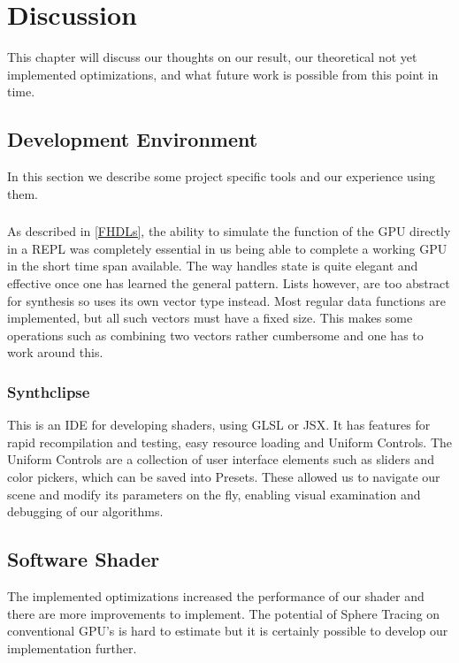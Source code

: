 \chapter{Discussion} 

	This chapter will discuss our thoughts on our result, our theoretical not
	yet	implemented optimizations, and what future work is possible from this
	point in time.
	
	\section{Development Environment}
		
		In this section we describe some project specific tools and our experience using them.
		
		\subsection{\clash}
			As described in \ref{FHDLs}, the ability to simulate the function of
			the GPU directly in a REPL was completely essential in us being able
			to complete a working GPU in the short time span available. The way
			\clash{} handles state is quite elegant and effective once one has
			learned the general pattern. Lists however, are too abstract for
			synthesis so \clash{}  uses its own vector type instead. Most 
			regular
			data functions are implemented, but all such vectors must have a
			fixed size. This makes some operations such as combining two vectors
			rather cumbersome and one has to work around this.
	
		\subsection{Synthclipse}
			This is an IDE for developing shaders, using GLSL or JSX. It has
			features for rapid recompilation and testing, easy resource loading 
			and	Uniform Controls. The Uniform Controls are a collection of user
			interface elements such as sliders and color pickers, which can be
			saved into Presets. These allowed us to navigate our scene and 
			modify its parameters on the fly, enabling visual examination and 
			debugging of our algorithms.		
		
		\section{Software Shader}

			The implemented optimizations increased the performance of our 
			shader and there are more improvements to implement. The potential
			of Sphere Tracing on conventional GPU's is hard to estimate but 
			it is certainly possible to develop our implementation further.
			
